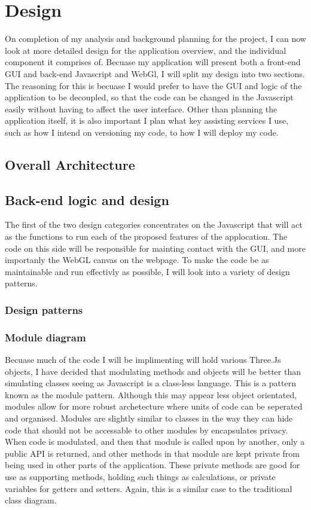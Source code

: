 \chapter{Design}
On completion of my analysis and background planning for the project, I can now look at more detailed design for the application overview, and the individual component it comprises of. Becuase my application will present both a front-end GUI and back-end Javascript and WebGl, I will split my design into two sections. The reasoning for this is becuase I would prefer to have the GUI and logic of the application to be decoupled, so that the code can be changed in the Javascript easily without having to affect the user interface. Other than planning the application itself, it is also important I plan what key assisting services I use, such as how I intend on versioning my code, to how I will deploy my code.

\section{Overall Architecture}

\section{Back-end logic and design}
The first of the two design categories concentrates on the Javascript that will act as the functions to run each of the proposed features of the applocation. The code on this side will be responsible for mainting contact with the GUI, and more importanly the WebGL canvas on the webpage. To make the code be as maintainable and run effectivly as possible, I will look into a variety of design patterns.

\subsection{Design patterns}


\subsection{Module diagram}
Becuase much of the code I will be implimenting will hold various Three.Js objects, I have decided that modulating methods and objects will be better than simulating classes seeing as Javascript is a class-less language. This is a pattern known as the module pattern. Although this may appear less object orientated, modules allow for more robust archetecture where units of code can be seperated and organised. Modules are slightly similar to classes in the way they can hide code that should not be accessable to other modules by encapsulates privacy. When code is modulated, and then that module is called upon by another, only a public API is returned, and other methods in that module are kept private from being used in other parts of the application. These private methods are good for use as supporting methods, holding such things as calculations, or private variables for getters and setters. Again, this is a similar case to the traditional class diagram.

